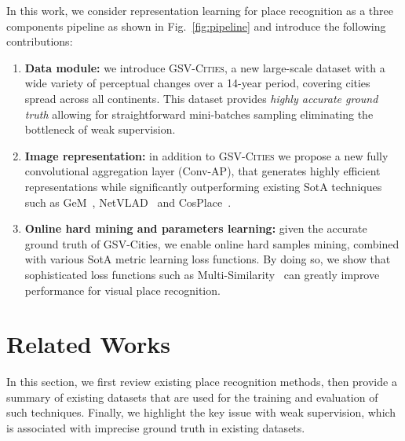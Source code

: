 \documentclass{article}
\begin{document}
In this work, we consider representation learning for place recognition as a three components pipeline as shown in Fig.~\ref{fig:pipeline} and introduce the following contributions:
\begin{enumerate}
    \item \textbf{Data module:} we introduce \textsc{GSV-Cities}, a new large-scale dataset with a wide variety of perceptual changes over a 14-year period, covering  cities spread across all continents. This dataset provides \emph{highly accurate ground truth} allowing for straightforward mini-batches sampling eliminating the bottleneck of weak supervision.
    \item \textbf{Image representation:} in addition to \textsc{GSV-Cities} we propose a new fully convolutional aggregation layer (Conv-AP), that generates highly efficient representations while significantly outperforming existing SotA techniques such as GeM~\cite{radenovic2018fine}, NetVLAD~\cite{arandjelovic2016netvlad} and CosPlace~\cite{berton2022rethinking}.
    \item \textbf{Online hard mining and parameters learning:}  given the accurate ground truth of GSV-Cities, we enable online hard samples mining, combined with various SotA metric learning loss functions. By doing so, we show that sophisticated loss functions such as Multi-Similarity~\cite{wang2019multi} can greatly improve performance for visual place recognition.
\end{enumerate}


\section{Related Works}
In this section, we first review existing place recognition methods, then provide a summary of existing datasets that are used for the training and evaluation of such techniques. Finally, we highlight the key issue with weak supervision, which is associated with imprecise ground truth in existing datasets.
\end{document}
